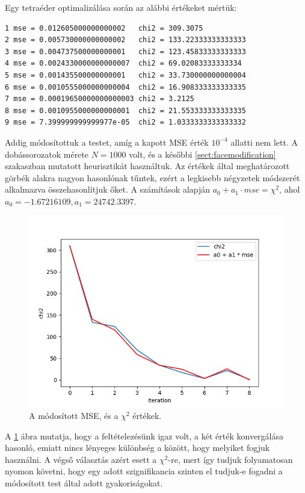 Egy tetraéder optimalizálása során az alábbi értékeket mértük:
\begin{verbatim}
1 mse = 0.012605000000000002   chi2 = 309.3075
2 mse = 0.005730000000000002   chi2 = 133.22333333333333
3 mse = 0.004737500000000001   chi2 = 123.45833333333333
4 mse = 0.0024330000000000007  chi2 = 69.02083333333334
5 mse = 0.001435500000000001   chi2 = 33.730000000000004
6 mse = 0.0010555000000000004  chi2 = 16.908333333333335
7 mse = 0.00019650000000000003 chi2 = 3.2125
8 mse = 0.0010955000000000001  chi2 = 21.553333333333335
9 mse = 7.399999999999977e-05  chi2 = 1.0333333333333332
\end{verbatim}
Addig módosítottuk a testet, amíg a kapott MSE érték $10^{-4}$ allatti nem lett. A dobássorozatok mérete $N=1000$ volt, és a későbbi \ref{sect:facemodification} szakaszban mutatott heurisztikát használtuk.
Az értékek által meghatározott görbék alakra nagyon hasonlónak tűntek, ezért a legkisebb négyzetek módszerét alkalmazva összehasonlítjuk őket.
A számítások alapján $a_0 + a_1\cdot mse = \chi^2$, ahol $a_0 = -1.67216109, a_1 = 24742.3397$.
\begin{figure}[h!]
	\centering
	\includegraphics[scale=0.7]{images/mse_vs_chi2.png}
	\caption{A módosított MSE, és a $\chi^2$ értékek.}
	\label{fig:mse_vs_chi2}
\end{figure}
A \ref{fig:mse_vs_chi2} ábra mutatja, hogy a feltételezésünk igaz volt, a két érték konvergálása hasonló, emiatt nincs lényeges különbség a között, hogy melyiket fogjuk használni.
A végső választás azért esett a $\chi^2$-re, mert így tudjuk folyamatosan nyomon követni, hogy egy adott szignifikancia szinten el tudjuk-e fogadni a módosított test által adott gyakoriságokat.

